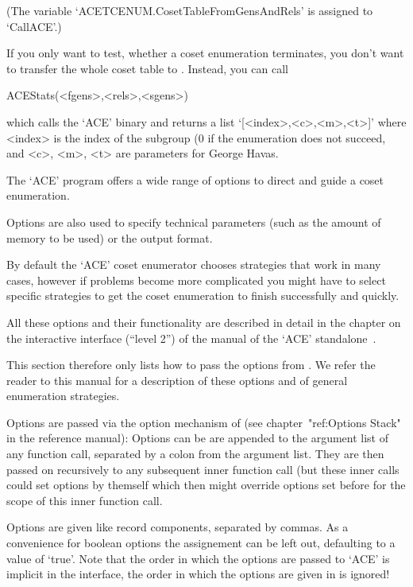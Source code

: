 (The variable `ACETCENUM.CosetTableFromGensAndRels' is assigned to
`CallACE'.)

If you only want to test, whether a coset enumeration terminates, you don't
want to transfer the whole coset table to {\GAP}. Instead, you can call

\>ACEStats(<fgens>,<rels>,<sgens>)

which calls the `ACE' binary and returns a list `[<index>,<c>,<m>,<t>]'
where <index> is the index of the subgroup (0 if the enumeration does not
succeed, and <c>, <m>, <t> are parameters for George Havas.


The `ACE' program offers a wide range of options to direct and guide a
coset enumeration.

Options are also used to specify technical parameters (such as the amount of
memory to be used) or the output format.

By default the `ACE' coset enumerator chooses strategies that work in many 
cases, however if problems become more complicated you might have to select
specific strategies to get the coset enumeration to finish successfully and
quickly.

All these options and their functionality are described in detail in the
chapter on the interactive interface (``level 2'') of the manual of the
`ACE' standalone~\cite{aceman}. 

This section therefore only lists how to pass the options from {\GAP}.
We refer the reader to this manual for a
description of these options and of general enumeration strategies.

Options are passed via the option mechanism of {\GAP} (see
chapter~"ref:Options Stack" in the reference manual):
Options can be are appended to the argument list of any function call,
separated by a colon from the argument list. They are then passed on
recursively to any subsequent inner function call (but these inner calls
could set options by themself which then might override options set before
for the scope of this inner function call.

Options are given like record components, separated by commas. As a
convenience for boolean options the assignement can be left out, defaulting
to a value of `true'. Note that the order in which the options are passed to
`ACE' is implicit in the interface, the order in which the options are given
in {\GAP} is ignored!

